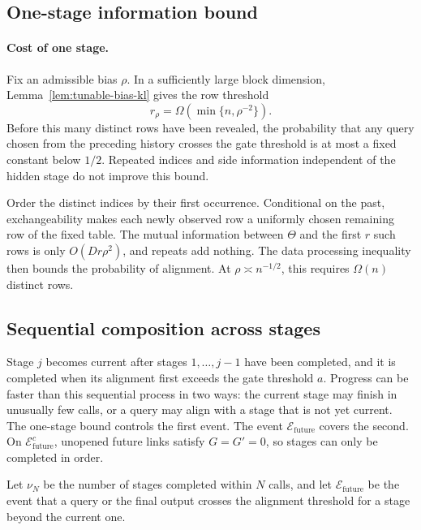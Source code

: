\documentclass{article}
\theoremstyle{definition}
\newcommand{\cEfuture}{\mathcal{E}_{\mathrm{future}}}
\begin{document}
\subsection{One-stage information bound}

\paragraph{Cost of one stage.}
Fix an admissible bias $\rho$.  In a sufficiently large block dimension,
Lemma~\ref{lem:tunable-bias-kl} gives the row threshold
\begin{equation}
 r_\rho=\Omega\!\left(\min\{n,\rho^{-2}\}\right).
\end{equation}
Before this many distinct rows have been revealed, the probability that any
query chosen from the preceding history crosses the gate threshold is at most a
fixed constant below $1/2$.  Repeated indices and side information independent
of the hidden stage do not improve this bound.

Order the distinct indices by their first occurrence.  Conditional on the
past, exchangeability makes each newly observed row a uniformly chosen
remaining row of the fixed table.  The mutual information between $\Theta$ and
the first $r$ such rows is only $O(Dr\rho^2)$, and repeats add nothing.  The
data processing inequality then bounds the probability of alignment.  At
$\rho\asymp n^{-1/2}$, this requires $\Omega(n)$ distinct rows.

\subsection{Sequential composition across stages}

Stage $j$ becomes current after stages $1,\ldots,j-1$ have been completed, and
it is completed when its alignment first exceeds the gate threshold $a$.
Progress can be faster than this sequential process in two ways: the current
stage may finish in unusually few calls, or a query may align with a stage that
is not yet current.  The one-stage bound controls the first event.  The event
$\cEfuture$ covers the second.  On $\cEfuture^c$, unopened
future links satisfy $G=G'=0$, so stages can only be completed in order.

Let $\nu_N$ be the number of stages completed within $N$ calls, and let
$\cEfuture$ be the event that a query or the final output crosses the alignment
threshold for a stage beyond the current one.
\end{document}
